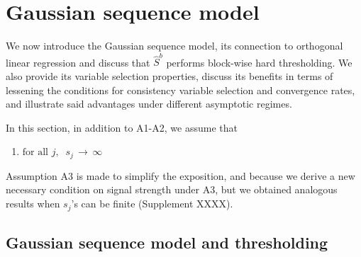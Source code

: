 \documentclass[aos]{imsart}
\theoremstyle{plain}
\begin{document}
\section{Gaussian sequence model}\label{sec:properties_orth}

We now introduce the Gaussian sequence model, its connection to orthogonal linear regression and discuss that $\hat S^b$ performs block-wise hard thresholding. We also provide its variable selection properties, discuss its benefits in terms of lessening the conditions for consistency variable selection and convergence rates, and illustrate said advantages under different asymptotic regimes.

In this section, in addition to A1-A2, we assume that
\begin{enumerate}[start=3,label={(A\arabic*)}]
    \item $\text{for all } j, \;\; s_j \,\to \, \infty$
\end{enumerate}
Assumption A3 is made to simplify the exposition, and because we derive a new necessary condition on signal strength under A3, but we obtained analogous results when $s_j$'s can be finite (Supplement XXXX).

\subsection{Gaussian sequence model and thresholding}\label{sec:GSMgen}
\end{document}
